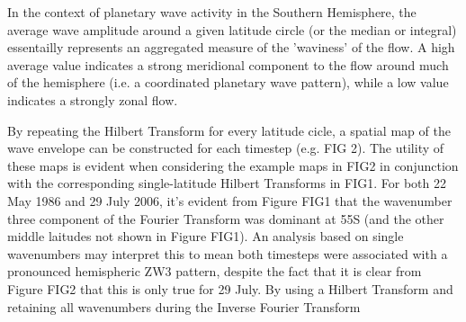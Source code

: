 In the context of planetary wave activity in the Southern Hemisphere, the average wave amplitude around a given latitude circle (or the median or integral) essentailly represents an aggregated measure of the 'waviness' of the flow. A high average value indicates a strong meridional component to the flow around much of the hemisphere (i.e. a coordinated planetary wave pattern), while a low value indicates a strongly zonal flow. 

By repeating the Hilbert Transform for every latitude cicle, a spatial map of the wave envelope can be constructed for each timestep (e.g. FIG 2). The utility of these maps is evident when considering the example maps in FIG2 in conjunction with the corresponding single-latitude Hilbert Transforms in FIG1. For both 22 May 1986 and 29 July 2006, it's evident from Figure FIG1 that the wavenumber three component of the Fourier Transform was dominant at 55S (and the other middle laitudes not shown in Figure FIG1). An analysis based on single wavenumbers may interpret this to mean both timesteps were associated with a pronounced hemispheric ZW3 pattern, despite the fact that it is clear from Figure FIG2 that this is only true for 29 July. By using a Hilbert Transform and retaining all wavenumbers during the Inverse Fourier Transform
